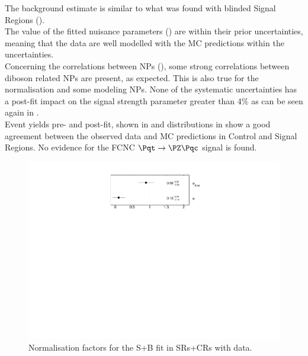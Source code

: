 The background estimate is similar to what was found with blinded Signal Regions ().\\
The value of the fitted nuisance parameters () are within their prior uncertainties,
meaning that the data are well modelled with the MC predictions within the uncertainties.\\
Concerning the correlations between NPs
(), some strong correlations
between diboson related NPs are present, as expected. This is also
true for the \ttbar normalisation and some \ttbar modeling NPs. 
None of the systematic uncertainties has a post-fit impact on the signal strength parameter greater than 4\% as can be seen again in .\\
Event yields pre- and post-fit, shown in  and distributions in  show a good agreement between the observed data and MC predictions in Control and Signal Regions. No evidence for the FCNC $\mathrm{\Pqt\rightarrow\PZ\Pqc}$ signal is found.

\begin{figure}[htbp]
	\centering
	\includegraphics[width=.5\textwidth]{Chapters/CH8/figures/SPLUSB_CRSR_DL1rc_unblind/NormFactors}
	\caption{Normalisation factors for the S+B \tZc fit in SRs+CRs with data.}%
	\label{fig:stat:tzc:splusb:crsr:norm_unb}
\end{figure}

